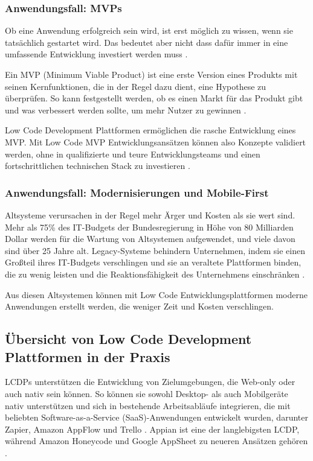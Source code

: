 \documentclass[12pt]{article} %
\begin{document}
	\subsubsection{Anwendungsfall: MVPs} \label{MVP}
	Ob eine Anwendung erfolgreich sein wird, ist erst möglich zu wissen, wenn sie tatsächlich gestartet wird. Das bedeutet aber nicht dass dafür immer in eine umfassende Entwicklung investiert werden muss \autocite{OleksiiGlib.2022}. \newline
	
	Ein MVP (Minimum Viable Product) ist eine erste Version eines Produkts mit seinen Kernfunktionen, die in der Regel dazu dient, eine Hypothese zu überprüfen. So kann festgestellt werden, ob es einen Markt für das Produkt gibt und was verbessert werden sollte, um mehr Nutzer zu gewinnen \autocite{OleksiiGlib.2022}.
	
	Low Code Development Plattformen ermöglichen die rasche Entwicklung eines MVP. Mit Low Code MVP Entwicklungsansätzen können also Konzepte validiert werden, ohne in qualifizierte und teure Entwicklungsteams und einen fortschrittlichen technischen Stack zu investieren \autocite{OleksiiGlib.2022}.
	
	\subsubsection{Anwendungsfall: Modernisierungen und Mobile-First}	
	Altsysteme verursachen in der Regel mehr Ärger und Kosten als sie wert sind. Mehr als 75\% des IT-Budgets der Bundesregierung in Höhe von 80 Milliarden Dollar werden für die Wartung von Altsystemen aufgewendet, und viele davon sind über 25 Jahre alt. Legacy-Systeme behindern Unternehmen, indem sie einen Großteil ihres IT-Budgets verschlingen und sie an veraltete Plattformen binden, die zu wenig leisten und die Reaktionsfähigkeit des Unternehmens einschränken \autocite{KevinShuler.2023}.
	
	Aus diesen Altsystemen können mit Low Code Entwicklungsplattformen moderne Anwendungen erstellt werden, die weniger Zeit und Kosten verschlingen. 	
	
	\subsection{Übersicht von Low Code Development Plattformen in der Praxis}	
	LCDPs unterstützen die Entwicklung von Zielumgebungen, die Web-only oder auch nativ sein können. So können sie sowohl Desktop- als auch Mobilgeräte nativ unterstützen und sich in bestehende Arbeitsabläufe integrieren, die mit beliebten Software-as-a-Service (SaaS)-Anwendungen entwickelt wurden, darunter Zapier, Amazon AppFlow und Trello \autocite{DiRuscio.2022}. Appian ist eine der langlebigsten LCDP, während Amazon Honeycode und Google AppSheet zu neueren Ansätzen gehören \autocite{DiRuscio.2022}. \newline
	
\end{document}
